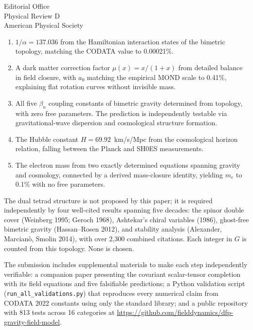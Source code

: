 \documentclass[11pt]{letter}
\begin{document}
\begin{letter}{Editorial Office\\Physical Review D\\American Physical Society}
\begin{enumerate}
\item $1/\alpha = 137.036$ from the Hamiltonian interaction states of the bimetric topology, matching the CODATA value to 0.00021\%.

\item A dark matter correction factor $\mu(x) = x/(1+x)$ from detailed balance in field closure, with $a_0$ matching the empirical MOND scale to 0.41\%, explaining flat rotation curves without invisible mass.

\item All five $\beta_n$ coupling constants of bimetric gravity determined from topology, with zero free parameters. The prediction is independently testable via gravitational-wave dispersion and cosmological structure formation.

\item The Hubble constant $H = 69.92$~km/s/Mpc from the cosmological horizon relation, falling between the Planck and SH0ES measurements.

\item The electron mass from two exactly determined equations spanning gravity and cosmology, connected by a derived mass-closure identity, yielding $m_e$ to 0.1\% with no free parameters.
\end{enumerate}


The dual tetrad structure is not proposed by this paper; it is required independently by four well-cited results spanning five decades: the spinor double cover (Weinberg 1995; Geroch 1968), Ashtekar's chiral variables (1986), ghost-free bimetric gravity (Hassan--Rosen 2012), and stability analysis (Alexander, Marcian\`{o}, Smolin 2014), with over 2,300 combined citations. Each integer in $G$ is counted from this topology. None is chosen.


The submission includes supplemental materials to make each step independently verifiable: a companion paper presenting the covariant scalar-tensor completion with its field equations and five falsifiable predictions; a Python validation script (\texttt{run\_all\_validations.py}) that reproduces every numerical claim from CODATA 2022 constants using only the standard library; and a public repository with 813 tests across 16 categories at \url{https://github.com/fielddynamics/dfp-gravity-field-model}.


\end{letter}
\end{document}
